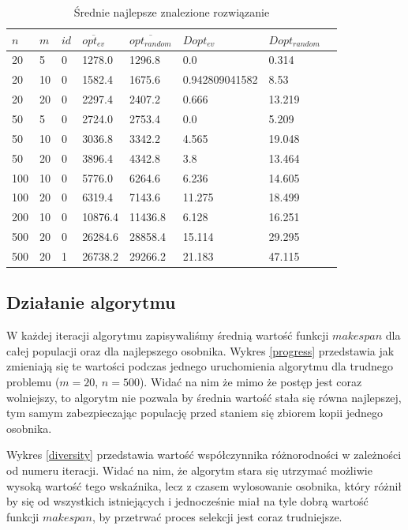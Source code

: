 \documentclass[11pt, a4wide]{article}
\begin{document}
\begin{table}[H]
\caption{Średnie najlepsze znalezione rozwiązanie}
\label{mean}
\begin{center}
\begin{tabular}{|l|l|l|l||l|l||l|l|}
  \hline
  $n$ & $m$ & $id$ & $\overline{opt_{ev}}$ & $\overline{opt_{random}}$ & $Dopt_{ev}$ & $Dopt_{random}$ \\
  \hline
  20 & 5 & 0 & 1278.0 & 1296.8 & 0.0 & 0.314 \\
  20 & 10 & 0 & 1582.4 & 1675.6 & 0.942809041582 & 8.53 \\
  20 & 20 & 0 & 2297.4 & 2407.2 & 0.666 & 13.219 \\
  50 & 5 & 0 & 2724.0 & 2753.4 & 0.0 & 5.209 \\
  50 & 10 & 0 & 3036.8 & 3342.2 & 4.565 & 19.048 \\
  50 & 20 & 0 & 3896.4 & 4342.8 & 3.8 & 13.464 \\
  100 & 10 & 0 & 5776.0 & 6264.6 & 6.236 & 14.605 \\
  100 & 20 & 0 & 6319.4 & 7143.6 & 11.275 & 18.499 \\
  200 & 10 & 0 & 10876.4 & 11436.8 & 6.128 & 16.251 \\
  500 & 20 & 0 & 26284.6 & 28858.4 & 15.114 & 29.295 \\
  500 & 20 & 1 & 26738.2 & 29266.2 & 21.183 & 47.115 \\
  \hline
\end{tabular}
\end{center}
\end{table}



\subsection{Działanie algorytmu}
W każdej iteracji algorytmu zapisywaliśmy średnią wartość funkcji $makespan$ dla całej populacji
oraz dla najlepszego osobnika. Wykres \ref{progress} przedstawia jak zmieniają się te wartości 
podczas jednego uruchomienia algorytmu dla trudnego problemu ($m = 20$, $n = 500$). Widać na nim
że mimo że postęp jest coraz wolniejszy, to algorytm nie pozwala by średnia wartość stała się równa
najlepszej, tym samym zabezpieczając populację przed staniem się zbiorem kopii jednego osobnika.

Wykres \ref{diversity} przedstawia wartość współczynnika różnorodności w zależności od numeru iteracji.
Widać na nim, że algorytm stara się utrzymać możliwie wysoką wartość tego wskaźnika, lecz z czasem
wylosowanie osobnika, który różnił by się od wszystkich istniejących i jednocześnie miał na tyle
dobrą wartość funkcji $makespan$, by przetrwać proces selekcji jest coraz trudniejsze.
\end{document}
